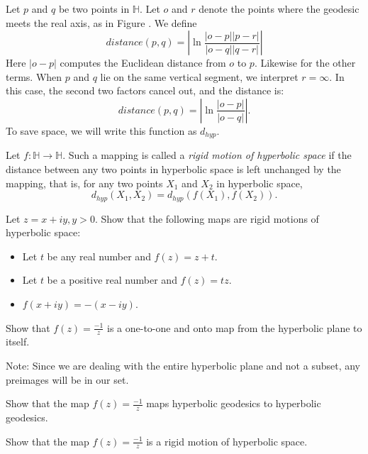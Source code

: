 \documentclass[newpage,hints,handout]{ximera}
\begin{document}
\begin{definition}
 Let $p$ and $q$ be two points in $\mathbb{H}$. Let $o$ and $r$ denote the points
where the geodesic meets the real axis, as in Figure .
We define
\[distance(p, q) =\left|\ln\frac{|o-p||p-r|}{|o-q||q-r|}\right|\]
Here $|o - p|$ computes the Euclidean distance from $o$ to $p$. Likewise for the
other terms.
When $p$ and $q$ lie on the same vertical segment, we interpret $r = \infty$. In
this case, the second two factors cancel out, and the distance is:
\[distance(p, q) =\left|\ln\frac{|o-p|}{|o-q|}\right|.\]  To save space, we will write this function as $d_{hyp}$.
\end{definition}

\begin{definition} 
Let $f:\mathbb{H}\to\mathbb{H}$. Such a mapping is called a \emph{rigid motion of hyperbolic space} if the distance between any two points in hyperbolic space is left unchanged by the mapping, that is, for any two points $X_1$ and $X_2$ in hyperbolic space, \[d_{hyp}(X_1,X_2)=d_{hyp}(f(X_1),f(X_2)).\]
\end{definition}

\begin{problem}
 Let $z=x+iy, y>0$. Show that the following maps are rigid motions of hyperbolic space:
 
\begin{itemize}
\item Let $t$ be any real number and $f(z) = z +t$.
\item Let $t$ be a positive real number and $f(z) = tz$.
\item $f(x+iy)=-(x-iy)$.
\end{itemize}
 
\end{problem}

\begin{problem}
 Show that $f(z)=\frac{-1}{z}$ is a one-to-one and onto map from the hyperbolic plane to itself.
 
 Note: Since we are dealing with the entire hyperbolic plane and not a subset, any preimages will be in our set.
\end{problem}

\begin{problem}
Show that the map $f(z) = \frac{-1}{z}$ maps hyperbolic geodesics to hyperbolic geodesics.
\end{problem}

\begin{problem}
Show that the map $f(z) = \frac{-1}{z}$ is a rigid motion of hyperbolic space.
\end{problem}
\end{document}
